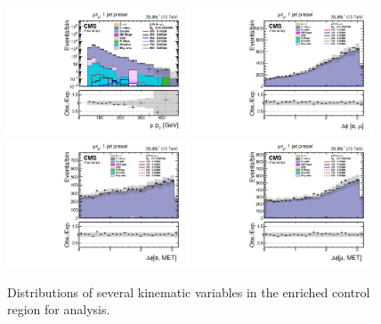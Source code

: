 {{\begin{figure}[htbp]
     \centering
      \includegraphics[width=0.48\textwidth]{plots_and_figures/chapter6/tt_cr_hm/log_mutaue_1jet_presel_mPt.pdf}
      \includegraphics[width=0.48\textwidth]{plots_and_figures/chapter6/tt_cr_hm/mutaue_1jet_presel_dphiemu.pdf}\\
      \includegraphics[width=0.48\textwidth]{plots_and_figures/chapter6/tt_cr_hm/mutaue_1jet_presel_dphiEMet.pdf}
      \includegraphics[width=0.48\textwidth]{plots_and_figures/chapter6/tt_cr_hm/mutaue_1jet_presel_dphiMuMet.pdf}\\
     \caption{Distributions of several kinematic variables in the \ttb enriched control region for \Hmue analysis.}
     \label{fig:tt_cr}
\end{figure}

}}
